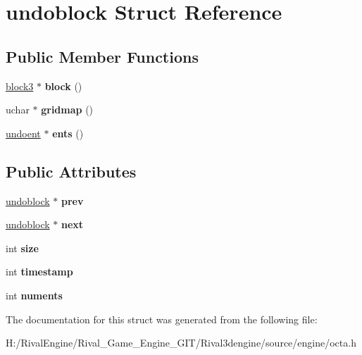 \hypertarget{structundoblock}{}\section{undoblock Struct Reference}
\label{structundoblock}
\subsection*{Public Member Functions}
\begin{DoxyCompactItemize}
\item 
\mbox{\label{structundoblock_a659aca354462b2f993dabee672bb905f}} 
\hyperlink{structblock3}{block3} $\ast$ {\bfseries block} ()
\item 
\mbox{\label{structundoblock_ae5ff067a5ccd855244ed0a0f1a4d8b97}} 
uchar $\ast$ {\bfseries gridmap} ()
\item 
\mbox{\label{structundoblock_a35a10a56d051c64852f4719c2f504ba4}} 
\hyperlink{structundoent}{undoent} $\ast$ {\bfseries ents} ()
\end{DoxyCompactItemize}
\subsection*{Public Attributes}
\begin{DoxyCompactItemize}
\item 
\mbox{\label{structundoblock_a1efaff15b9b5ddcd0caa28bfd41c62eb}} 
\hyperlink{structundoblock}{undoblock} $\ast$ {\bfseries prev}
\item 
\mbox{\label{structundoblock_abb50e7d7cd833049aba813ad9eb9b08a}} 
\hyperlink{structundoblock}{undoblock} $\ast$ {\bfseries next}
\item 
\mbox{\label{structundoblock_a0fb516658877a3ab5933b04708332a3b}} 
int {\bfseries size}
\item 
\mbox{\label{structundoblock_ac7993663dac147f8134a9f24ec91a876}} 
int {\bfseries timestamp}
\item 
\mbox{\label{structundoblock_a1dec53ad5f85909e6796642ea8e4b663}} 
int {\bfseries numents}
\end{DoxyCompactItemize}


The documentation for this struct was generated from the following file\+:\begin{DoxyCompactItemize}
\item 
H\+:/\+Rival\+Engine/\+Rival\+\_\+\+Game\+\_\+\+Engine\+\_\+\+G\+I\+T/\+Rival3dengine/source/engine/octa.\+h\end{DoxyCompactItemize}

